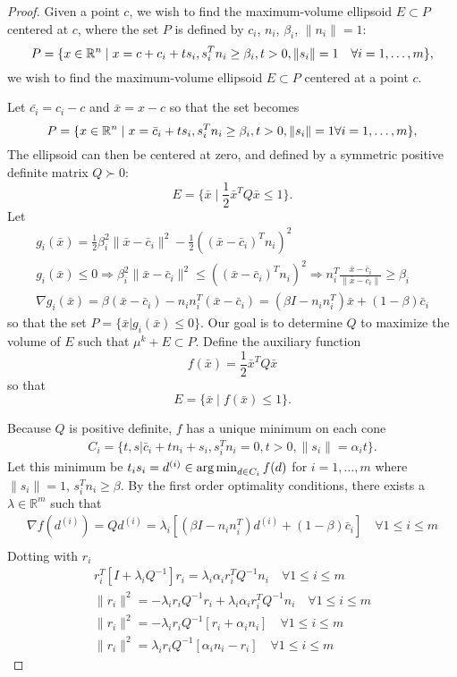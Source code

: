 \begin{proof}
Given a point $c$, we wish to find the maximum-volume ellipsoid  $E \subset P$ centered at $c$, where the set $P$ is defined by $c_i$, $n_i$, $\beta_i$, $\|n_i\| = 1$:
\[
P = \{ x \in {\mathbb R^{n}} \; | \;  x = c + c_i + ts_i, s_i^Tn_i \ge \beta_i, t>0, \|s_i\| = 1\quad \forall i = 1,\ldots,m\},
\]
we wish to find the maximum-volume ellipsoid $E \subset P$ centered at a point $c$.


Let $\bar{c_i} = c_i - c$ and $\bar x = x - c$ so that the set becomes
\[
P = \{ x \in {\mathbb R^{n}} \; | \;  x = \bar c_i + ts_i, s_i^Tn_i \ge \beta_i, t>0, \|s_i\| = 1 \forall i = 1,\ldots,m\},
\]
The ellipsoid can then be centered at zero, and defined by a symmetric positive definite matrix $Q \succ 0$:
\[
E = \{ \bar x \; | \; \frac 1 2 \bar x^T Q \bar x \le 1 \}.
\]
Let 
\begin{align*}
g_i(\bar x) = \frac 1 2 \beta_i^2\|\bar x - \bar c_i\|^2 - \frac 1 2 \left((\bar x - \bar c_i)^Tn_i\right)^2 \\
g_i(\bar x) \le 0 
\Longrightarrow \beta_i^2\|\bar x - \bar c_i\|^2 \le \left((\bar x - \bar c_i)^Tn_i\right)^2 \Longrightarrow n_i^T\frac{\bar x - \bar c_i}{\|\bar x - \bar c_i\|}\ge \beta_i \\
\nabla g_i(\bar x) = \beta(\bar x - \bar c_i) - n_in_i^T(\bar x - \bar c_i) = (\beta I - n_i n_i^T) \bar x + (1 - \beta) \bar c_i
\end{align*}
so that the set $P = \{\bar x | g_i(\bar x) \le 0\}$.
Our goal is to determine $Q$ to maximize the volume of $E$ such that $\mu^{k} + E \subset P$.
Define the auxiliary function 
\[
f(\bar x) = \frac 1 2 \bar x^T Q \bar x
\]
so that 
\[
E = \{ \bar x \; | \; f(\bar x) \le 1 \}.
\]

\color{red}
Because $Q$ is positive definite, $f$ has a unique minimum on each cone 
\begin{align*}
C_i = \{ t, s | \bar c_i + tn_i + s_i, s_i^Tn_i = 0, t>0, \|s_i\| = \alpha_i t \}.
\end{align*}
\color{black}
Let this minimum be $t_i s_i = d^{(i)} \in \operatorname*{arg\,min}_{d \in C_i} f(d)$ for $i=1,\ldots,m$ where $\|s_i\| = 1$, $s_i^Tn_i \ge \beta$.
By the first order optimality conditions, there exists a $\lambda \in \mathbb R^m$ such that
\begin{align*}
\nabla f(d^{(i)}) = Q d^{(i)} = \lambda_i \left[(\beta I - n_i n_i^T) d^{(i)} + (1 - \beta) \bar c_i \right]\quad \forall 1\le i\le m \\
\end{align*}
Dotting with $r_i$
\begin{align*}
r_i^T\left[I + \lambda_i Q^{-1}\right]r_i = \lambda_i\alpha_i r_i^TQ^{-1} n_i \quad \forall 1\le i\le m \\
\|r_i\|^2 = - \lambda_ir_i Q^{-1}r_i + \lambda_i\alpha_i r_i^TQ^{-1} n_i \quad \forall 1\le i\le m \\
\|r_i\|^2 = - \lambda_ir_i Q^{-1}\left[r_i + \alpha_i n_i\right] \quad \forall 1\le i\le m \\
\|r_i\|^2 = \lambda_ir_i Q^{-1}\left[\alpha_i n_i - r_i\right] \quad \forall 1\le i\le m
\end{align*}


\end{proof}
